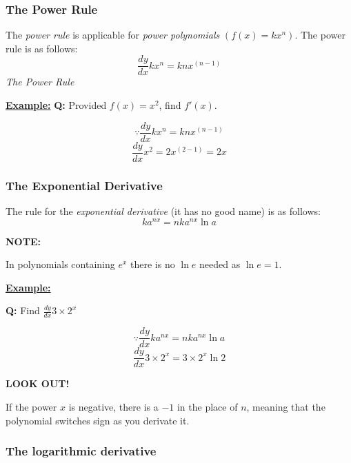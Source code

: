 \documentclass[12pt]{article}
\begin{document}
\subsubsection{The Power Rule}
The \emph{power rule} is applicable for \emph{power polynomials} $\left( f(x) = kx^n \right)$. The power rule is as follows:
\begin{equation}
	\frac{dy}{dx}kx^n=knx^{(n-1)}
\end{equation}
\emph{The Power Rule} \bigbreak

\begin{BOX}

	\textbf{\underline{Example:}} \bigbreak
	\textbf{Q:} Provided $f(x) = x^2$, find $f'(x)$. \bigbreak
	
		$$\because \frac{dy}{dx} kx^n = knx^{(n-1)}$$
		$$\frac{dy}{dx} x^2 = 2x^{(2-1)} = 2x$$
		
\end{BOX}


\subsubsection{The Exponential Derivative}
The rule for the \emph{exponential derivative} (it has no good name) is as follows:
\begin{equation}
	ka^{nx} = nka^{nx} \ln{a}
\end{equation}
\bigbreak

\textbf{NOTE:} \bigbreak

In polynomials containing $e^x$ there is no $\ln{e}$ needed as $\ln{e}=1$.

\begin{BOX}

	\textbf{\underline{Example:}} \bigbreak

	\textbf{Q:} Find $\frac{dy}{dx} 3 \times 2^x$ 

	$$\because \frac{dy}{dx}ka^{nx} = nka^{nx} \ln{a}$$
	$$\frac{dy}{dx} 3 \times 2^x = 3 \times 2^x \ln{2}$$

\end{BOX} \bigbreak

\textbf{LOOK OUT!}

If the power $x$ is negative, there is a $-1$ in the place of $n$, meaning that the polynomial switches sign as you derivate it.

\subsubsection{The logarithmic derivative}
\end{document}
